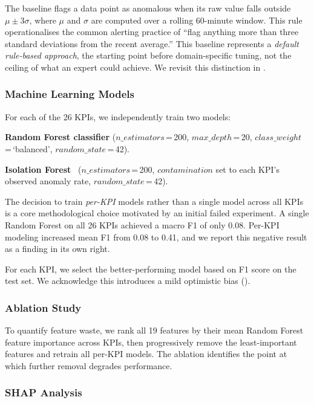 \documentclass[10pt,twocolumn]{article}
\begin{document}
The baseline flags a data point as anomalous when its raw value falls outside $\mu \pm 3\sigma$, where $\mu$ and $\sigma$ are computed over a rolling 60-minute window. This rule operationalises the common alerting practice of ``flag anything more than three standard deviations from the recent average.'' This baseline represents a \emph{default rule-based approach}, the starting point before domain-specific tuning, not the ceiling of what an expert could achieve. We revisit this distinction in .

\subsubsection{Machine Learning Models}

For each of the 26 KPIs, we independently train two models:

\textbf{Random Forest classifier} ($n\_estimators$\,=\,200, $max\_depth$\,=\,20, $class\_weight$\,=\,`balanced', $random\_state$\,=\,42).

\textbf{Isolation Forest}~\cite{liu2008} ($n\_estimators$\,=\,200, $contamination$ set to each KPI's observed anomaly rate, $random\_state$\,=\,42).

The decision to train \emph{per-KPI} models rather than a single model across all KPIs is a core methodological choice motivated by an initial failed experiment. A single Random Forest on all 26 KPIs achieved a macro F1 of only 0.08. Per-KPI modeling increased mean F1 from 0.08 to 0.41, and we report this negative result as a finding in its own right.

For each KPI, we select the better-performing model based on F1 score on the test set. We acknowledge this introduces a mild optimistic bias ().

\subsubsection{Ablation Study}

To quantify feature waste, we rank all 19 features by their mean Random Forest feature importance across KPIs, then progressively remove the least-important features and retrain all per-KPI models. The ablation identifies the point at which further removal degrades performance.

\subsubsection{SHAP Analysis}
\end{document}
